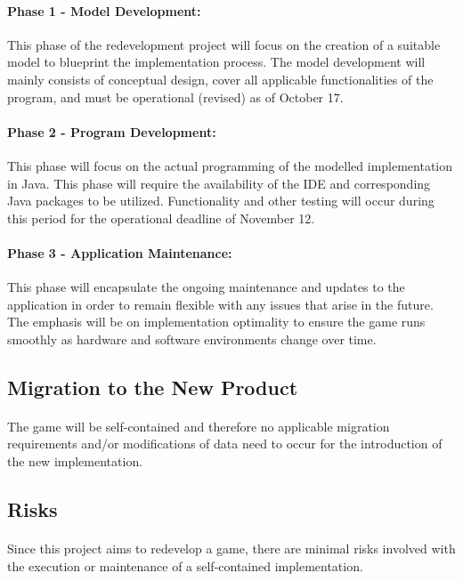 \documentclass[12pt, titlepage]{article}
\begin{document}
\paragraph{Phase 1 - Model Development:}
This phase of the redevelopment project will focus on the creation of a suitable model to blueprint the implementation process. The model development will mainly consists of conceptual design, cover all applicable functionalities of the program, and must be operational (revised) as of October 17.
\paragraph{Phase 2 - Program Development:}
This phase will focus on the actual programming of the modelled implementation in Java. This phase will require the availability of the IDE and corresponding Java packages to be utilized. Functionality and other testing will occur during this period for the operational deadline of November 12.
\paragraph{Phase 3 - Application Maintenance:}
This phase will encapsulate the ongoing maintenance and updates to the application in order to remain flexible with any issues that arise in the future. The emphasis will be on implementation optimality to ensure the game runs smoothly as hardware and software environments change over time.

\subsection{Migration to the New Product}
\paragraph{}
The game will be self-contained and therefore no applicable migration requirements and/or modifications of data need to occur for the introduction of the new implementation.

\subsection{Risks}
\paragraph{}
Since this project aims to redevelop a game, there are minimal risks involved with the execution or maintenance of a self-contained implementation.
\end{document}
